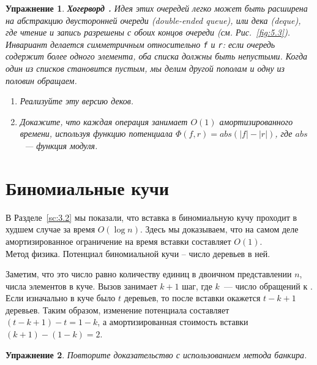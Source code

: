 \documentclass[aspectratio=169
  , xcolor={svgnames}
  , hyperref={ colorlinks,citecolor=DeepPink4
             , linkcolor=DarkRed,urlcolor=DarkBlue}
  , russian
  ]{beamer}
\newcommand{\term}[2]{\textit{#1} (#2)}
\theoremstyle{exerciseStyle1}
\newtheorem{exercise}{\textbf{Упражнение}}[section]
\renewcommand{\cite}[1]{}
\begin{document}
\ifanswers
\begin{frame}[fragile]{}
\begin{exercise}\label{ex:5.1}
  \textbf{Хогерворд \cite{Hoogerwoord1992}.}  Идея этих очередей легко
  может быть расширена на абстракцию \term{двусторонней очереди}{double-ended
    queue}, или \term{дека}{deque}, где чтение и запись разрешены с
  обоих концов очереди (см. Рис.~\ref{fig:5.3}). Инвариант делается
  симметричным относительно \lstinline!f! и \lstinline!r!: если
  очередь содержит более одного элемента, оба списка должны быть
  непустыми. Когда один из списков становится пустым, мы делим другой
  пополам и одну из половин обращаем.
  
  \begin{enumerate}
    \item Реализуйте эту версию деков.
    \item Докажите, что каждая операция занимает $O(1)$ амортизированного
    времени, используя функцию потенциала $\Phi(f,r) = abs(|f| -
    |r|)$, где $abs$~--- функция модуля.
  \end{enumerate}
\end{exercise}
\end{frame}
\fi

\section{Биномиальные кучи}
\label{sc:5.3}


\begin{frame}[fragile]{}
В Разделе~\ref{sc:3.2} мы показали, что вставка в биномиальную кучу
проходит в худшем случае за время $O(\log n)$. Здесь мы доказываем,
что на самом деле амортизированное ограничение на время вставки
составляет $O(1)$.\\

Метод физика. Потенциал биномиальной кучи -- число деревьев в ней. 

Заметим, что это число равно количеству
единиц в двоичном представлении $n$, числа элементов в куче.  Вызов
 занимает $k+1$ шаг, где $k$~--- число обращений к
. Если изначально в куче было $t$ деревьев, то после
вставки окажется $t - k + 1$ деревьев. Таким образом, изменение
потенциала составляет $(t - k + 1) - t = 1 - k$, а амортизированная
стоимость вставки $(k + 1) - (1 - k) = 2$.\\

\begin{exercise}\label{ex:5.2}
  Повторите доказательство с использованием метода банкира.
\end{exercise}

\end{frame}
\end{document}
